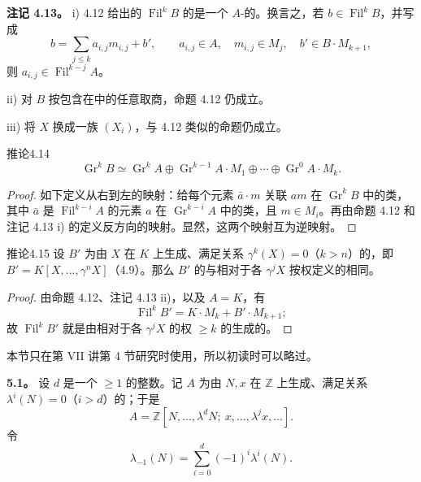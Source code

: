 \textbf{注记 4.13。} i) 4.12 给出的 $\operatorname{Fil}^kB$ 的是一个 $A$-的。换言之，若 $b\in\operatorname{Fil}^kB$，并写成
\[
b=\sum_{j\leqslant k}a_{i,j}m_{i,j}+b',\qquad
 a_{i,j}\in A,\quad m_{i,j}\in M_j,\quad b'\in B\cdot M_{k+1},
\]
则 $a_{i,j}\in\operatorname{Fil}^{k-j}A$。

 ii) 对 $B$ 按包含在中的任意取商，命题 4.12 仍成立。

 iii) 将 $X$ 换成一族 $(X_i)$，与 4.12 类似的命题仍成立。

\begin{SGAresult}{推论}{4.14}
\[
\operatorname{Gr}^kB\simeq\operatorname{Gr}^kA
\oplus\operatorname{Gr}^{k-1}A\cdot M_1\oplus\cdots
\oplus\operatorname{Gr}^0A\cdot M_k.
\]
\end{SGAresult}
\begin{proof}
如下定义从右到左的映射：给每个元素 $\bar a\cdot m$ 关联 $am$ 在 $\operatorname{Gr}^kB$ 中的类，其中 $\bar a$ 是 $\operatorname{Fil}^{k-i}A$ 的元素 $a$ 在 $\operatorname{Gr}^{k-i}A$ 中的类，且 $m\in M_i$。再由命题 4.12 和注记 4.13 i) 的定义反方向的映射。显然，这两个映射互为逆映射。
\end{proof}

\begin{SGAresult}{推论}{4.15}
设 $B'$ 为由 $X$ 在 $K$ 上生成、满足关系 $\gamma^k(X)=0$（$k>n$）的，即 $B'=K[X,\ldots,\gamma^nX]$（4.9）。那么 $B'$ 的与相对于各 $\gamma^jX$ 按权定义的相同。
\end{SGAresult}
\begin{proof}
由命题 4.12、注记 4.13 ii)，以及 $A=K$，有
\[
\operatorname{Fil}^kB'=K\cdot M_k+B'\cdot M_{k+1};
\]
故 $\operatorname{Fil}^kB'$ 就是由相对于各 $\gamma^jX$ 的权 $\geqslant k$ 的生成的。
\end{proof}

本节只在第 VII 讲第 4 节研究时使用，所以初读时可以略过。

\textbf{5.1。} 设 $d$ 是一个 $\geqslant1$ 的整数。记 $A$ 为由 $N,x$ 在 $\mathbb Z$ 上生成、满足关系 $\lambda^i(N)=0$（$i>d$）的；于是
\[
A=\mathbb Z[N,\ldots,\lambda^dN;\ x,\ldots,\lambda^jx,\ldots].
\]
令
\[
\lambda_{-1}(N)=\sum_{i=0}^d(-1)^i\lambda^i(N).
\]

